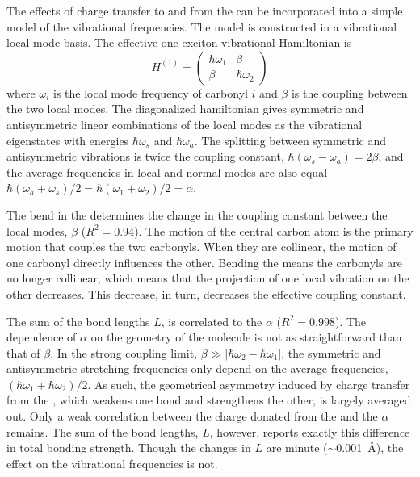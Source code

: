 The effects of charge transfer to and from the  can be incorporated into a simple model of the vibrational frequencies. The model is constructed in a vibrational local-mode basis. The effective one exciton vibrational Hamiltonian  is
\begin{equation}
        H^{(1)} =
        \begin{pmatrix}
          \hbar\omega_1 & \beta\\
          \beta & \hbar\omega_2
        \end{pmatrix}
      \end{equation}
where $\omega_i$ is the local mode frequency of carbonyl $i$ and $\beta$ is the coupling between the two local modes. The diagonalized hamiltonian gives symmetric and antisymmetric linear combinations of the local modes as the vibrational eigenstates with energies $\hbar\omega_s$ and $\hbar\omega_a$. The splitting between symmetric and antisymmetric vibrations is twice the coupling constant, $\hbar(\omega_s - \omega_a) =2\beta$, and the average frequencies in local and normal modes are also equal $\hbar(\omega_a+\omega_s)/2 = \hbar(\omega_1 + \omega_2)/2 = \alpha$.

The bend in the  determines the change in the coupling constant between the local modes, $\beta$ ($R^2 = 0.94$). The motion of the central carbon atom is the primary motion that couples the two carbonyls. When they are collinear, the motion of one carbonyl directly influences the other. Bending the  means the carbonyls are no longer collinear, which means that the projection of one local vibration on the other decreases. This decrease, in turn, decreases the effective coupling constant. 

The sum of the  bond lengths  $L$, is correlated to the $\alpha$  ($R^2=0.998$). The dependence of $\alpha$ on the geometry of the molecule is not as straightforward than that of $\beta$. In the strong coupling limit, $\beta\gg |\hbar\omega_2-\hbar\omega_1|$, the symmetric and antisymmetric stretching frequencies only depend on the average frequencies, $(\hbar\omega_1 + \hbar\omega_2)/2$. As such, the geometrical asymmetry induced by charge transfer from the , which weakens one bond and strengthens the other, is largely averaged out. Only a weak correlation between the charge donated from the  and the $\alpha$ remains. The sum of the bond lengths, $L$, however, reports exactly this difference in total bonding strength. Though the changes in $L$ are minute ($\sim$\SI{0.001}{\angstrom}), the effect on the vibrational frequencies is not.


